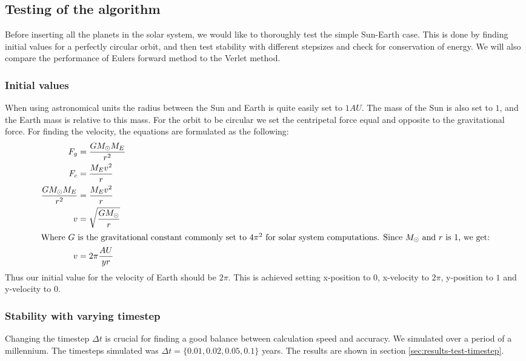 \documentclass[../main.tex]{subfiles}
\begin{document}
\subsection{Testing of the algorithm}
Before inserting all the planets in the solar system, we would like to thoroughly test the simple Sun-Earth case. This is done by finding initial values for a perfectly circular orbit, and then test stability with different stepsizes and check for conservation of energy. We will also compare the performance of Eulers forward method to the Verlet method.

\subsubsection{Initial values}
When using astronomical units the radius between the Sun and Earth is quite easily set to $1AU$. The mass of the Sun is also set to $1$, and the Earth mass is relative to this mass. For the orbit to be circular we set the centripetal force equal and opposite to the gravitational force. For finding the velocity, the equations are formulated as the following:
\begin{align}
  F_g &= \frac{G M_\odot M_E}{r^2}\nonumber \\
  F_c &= \frac{M_E v^2}{r}\nonumber \\
  \frac{G M_\odot M_E}{r^2} &= \frac{M_E v^2}{r}\nonumber \\
  v &= \sqrt{\frac{G M_\odot}{r}}\nonumber \\
  \intertext{Where $G$ is the gravitational constant commonly set to $4\pi^2$ for solar system computations. Since $M_\odot$ and $r$ is $1$, we get:}
  v &= 2\pi \frac{AU}{yr}
\end{align}
Thus our initial value for the velocity of Earth should be $2\pi$. This is achieved setting x-position to $0$, x-velocity to $2\pi$, y-position to $1$ and y-velocity to $0$.

\subsubsection{Stability with varying timestep}
Changing the timestep $\Delta t$ is crucial for finding a good balance between calculation speed and accuracy. We simulated over a period of a millennium. The timesteps simulated was $\Delta t = \{0.01, 0.02, 0.05, 0.1\}$ years. The results are shown in section \ref{sec:results-test-timestep}.
\end{document}
